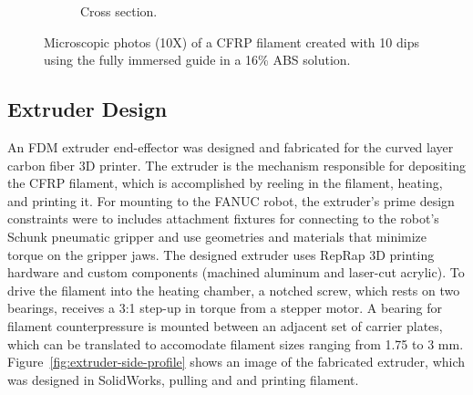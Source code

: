 \begin{figure}[t]
\begin{subfigure}[b]{0.4\linewidth}
                \caption{Cross section.}
                \label{fig:filament-108-40-dip-end}
        \end{subfigure}
        \caption{Microscopic photos (10X) of a CFRP filament created with 10 dips using the fully immersed guide in a 16\% ABS solution.}\label{fig:filament-microscope}
\end{figure}


\subsection*{Extruder Design}

An FDM extruder end-effector was designed and fabricated for the curved layer carbon fiber 3D printer. The extruder is the mechanism responsible for depositing the CFRP filament, which is accomplished by reeling in the filament, heating, and printing it. For mounting to the FANUC robot, the extruder's prime design constraints were to includes attachment fixtures for connecting to the robot's Schunk pneumatic gripper and use geometries and materials that minimize torque on the gripper jaws. The designed extruder uses RepRap 3D printing hardware and custom components (machined aluminum and laser-cut acrylic). To drive the filament into the heating chamber, a notched screw, which rests on two bearings, receives a 3:1 step-up in torque from a stepper motor. A bearing for filament counterpressure is mounted between an adjacent set of carrier plates, which can be translated to accomodate filament sizes ranging from 1.75 to 3 mm. Figure~\ref{fig:extruder-side-profile} shows an image of the fabricated extruder, which was designed in SolidWorks, pulling and and printing filament.


